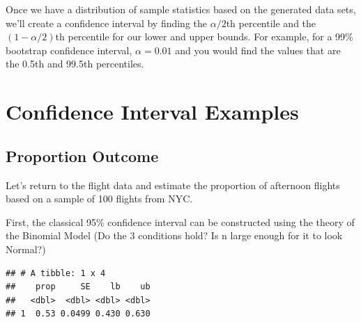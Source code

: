 \documentclass[]{book}
\newenvironment{Shaded}{\begin{snugshade}}{\end{snugshade}}
\newcommand{\DataTypeTok}[1]{\textcolor[rgb]{0.13,0.29,0.53}{#1}}
\newcommand{\DecValTok}[1]{\textcolor[rgb]{0.00,0.00,0.81}{#1}}
\newcommand{\KeywordTok}[1]{\textcolor[rgb]{0.13,0.29,0.53}{\textbf{#1}}}
\newcommand{\NormalTok}[1]{#1}
\newcommand{\OperatorTok}[1]{\textcolor[rgb]{0.81,0.36,0.00}{\textbf{#1}}}
\newcommand{\StringTok}[1]{\textcolor[rgb]{0.31,0.60,0.02}{#1}}
\begin{document}
Once we have a distribution of sample statistics based on the generated data sets, we'll create a confidence interval by finding the \(\alpha/2\)th percentile and the \((1-\alpha/2)\)th percentile for our lower and upper bounds. For example, for a 99\% bootstrap confidence interval, \(\alpha = 0.01\) and you would find the values that are the 0.5th and 99.5th percentiles.

\hypertarget{confidence-interval-examples}{%
\section{Confidence Interval Examples}\label{confidence-interval-examples}}

\hypertarget{proportion-outcome}{%
\subsection{Proportion Outcome}\label{proportion-outcome}}

Let's return to the flight data and estimate the proportion of afternoon flights based on a sample of 100 flights from NYC.

First, the classical 95\% confidence interval can be constructed using the theory of the Binomial Model (Do the 3 conditions hold? Is n large enough for it to look Normal?)

\begin{Shaded}
\end{Shaded}

\begin{verbatim}
## # A tibble: 1 x 4
##    prop     SE    lb    ub
##   <dbl>  <dbl> <dbl> <dbl>
## 1  0.53 0.0499 0.430 0.630
\end{verbatim}
\end{document}
